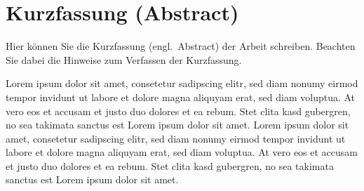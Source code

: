 \chapter*{Kurzfassung (Abstract)}

Hier können Sie die Kurzfassung (engl.~Abstract) der Arbeit schreiben. Beachten Sie dabei die Hinweise zum Verfassen der Kurzfassung.

Lorem ipsum dolor sit amet, consetetur sadipscing elitr, sed diam nonumy eirmod tempor invidunt ut labore et dolore magna aliquyam erat, 
sed diam voluptua. At vero eos et accusam et justo duo dolores et ea rebum. Stet clita kasd gubergren, no sea takimata sanctus est Lorem 
ipsum dolor sit amet. Lorem ipsum dolor sit amet, consetetur sadipscing elitr, sed diam nonumy eirmod tempor invidunt ut labore et dolore 
magna aliquyam erat, sed diam voluptua. At vero eos et accusam et justo duo dolores et ea rebum. Stet clita kasd gubergren, no sea takimata 
sanctus est Lorem ipsum dolor sit amet.


